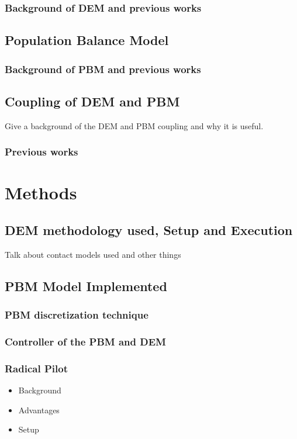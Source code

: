 \documentclass[preprint,11pt,authoryear]{elsarticle}
\begin{document}
\subsubsection{Background of DEM and previous works}

\subsection{Population Balance Model}

\subsubsection{Background of PBM and previous works}

\subsection{Coupling of DEM and PBM}
Give a  background of the DEM and PBM coupling and why it is useful.
\subsubsection{Previous works}


\section{Methods}
\subsection{DEM methodology used, Setup and Execution}
Talk about contact models used and other things

\subsection{PBM Model Implemented}

\subsubsection{PBM discretization technique}


\subsubsection{Controller of the PBM and DEM}

\subsubsection{Radical Pilot}
\begin{itemize}
\item{Background}
\item{Advantages}
\item{Setup}
\end{itemize}
\end{document}
